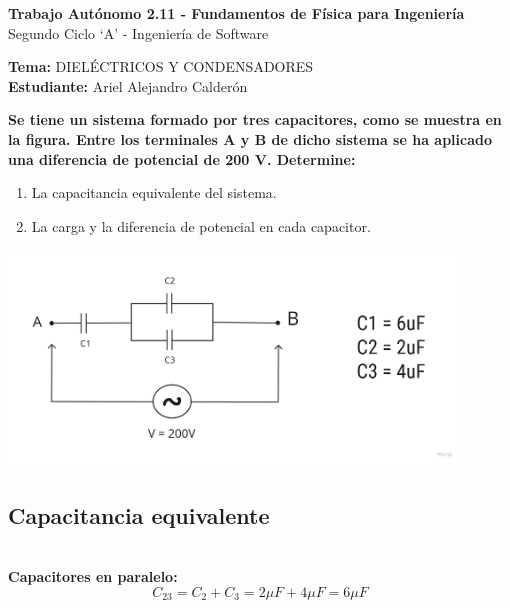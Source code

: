\documentclass[answers]{exam} %
\begin{document}
\begin{center}
	\large\textbf{Trabajo Autónomo 2.11 - Fundamentos de Física para Ingeniería}\\[1em]
	\large Segundo Ciclo \enquote*{A} - Ingeniería de Software\\[1em]
\end{center}

\vspace{0.5cm}
\noindent
\large\textbf{Tema:} DIELÉCTRICOS Y CONDENSADORES \\
\large\textbf{Estudiante:} Ariel Alejandro Calderón
\vspace{0.5cm}

\begin{questions}

	\question \textbf{Se tiene un sistema formado por tres capacitores, como se muestra en la figura. Entre los terminales A y B de dicho sistema se ha aplicado una diferencia de potencial de 200 V. Determine:}
	\begin{enumerate}[label=\alph*. ]
		\item  La capacitancia equivalente del sistema.
		\item  La carga y la diferencia de potencial en cada capacitor.
	\end{enumerate}

	\begin{minipage}{\textwidth}
		\centering
		\includegraphics[width=0.9\textwidth]{public/g1.png}\\
	\end{minipage}
	\begin{parts}

		\part{Capacitancia equivalente}\\

		\textbf{Capacitores en paralelo:}
		\[
			C_{23} = C_2 + C_3 = 2 \mu F + 4 \mu F = 6 \mu F
		\]


\end{parts}
\end{questions}
\end{document}
